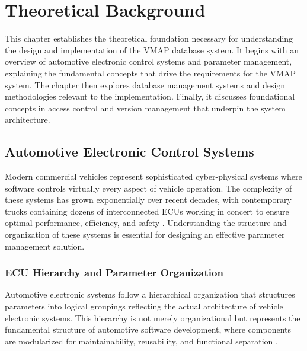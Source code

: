 \chapter{Theoretical Background}
\label{chap:theoretical-background}

This chapter establishes the theoretical foundation necessary for understanding the design and implementation of the \ac{VMAP} database system. It begins with an overview of automotive electronic control systems and parameter management, explaining the fundamental concepts that drive the requirements for the \ac{VMAP} system. The chapter then explores database management systems and design methodologies relevant to the implementation. Finally, it discusses foundational concepts in access control and version management that underpin the system architecture.

\section{Automotive Electronic Control Systems}
\label{sec:automotive-electronic-systems}

Modern commercial vehicles represent sophisticated cyber-physical systems where software controls virtually every aspect of vehicle operation. The complexity of these systems has grown exponentially over recent decades, with contemporary trucks containing dozens of interconnected \acp{ECU} working in concert to ensure optimal performance, efficiency, and safety \cite{staron2021automotive}. Understanding the structure and organization of these systems is essential for designing an effective parameter management solution.

\subsection{\ac{ECU} Hierarchy and Parameter Organization}
\label{subsec:ecu-hierarchy}

Automotive electronic systems follow a hierarchical organization that structures parameters into logical groupings reflecting the actual architecture of vehicle electronic systems. This hierarchy is not merely organizational but represents the fundamental structure of automotive software development, where components are modularized for maintainability, reusability, and functional separation \cite{pretschner2007software}.

